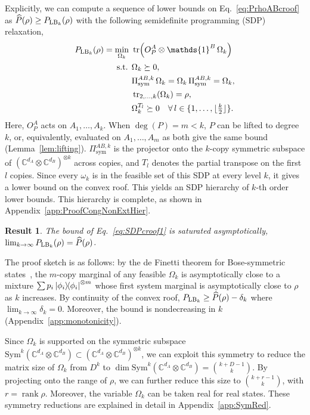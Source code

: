\documentclass[aps,pra,twocolumn,superscriptaddress]{revtex4-2}
\newcommand{\one}{\mathds{1}}
\newcommand{\I}{\one}
\newcommand{\C}{\mathds{C}}
\newtheorem{result}[theorem]{Result}
\begin{document}
Explicitly, we can compute a sequence
of lower bounds on Eq.~\eqref{eq:PrhoABcroof} as $\widehat{P}(\rho)\geq P_{{\rm LB}_k}(\rho)$ with the following semidefinite programming (SDP) relaxation,
\begin{align}
    P_{{\rm LB}_k}(\rho)=\min_{\Omega_k} \ &\tr\!\left(O_P^A \otimes \I^B \, \Omega_k\right)\label{eq:SDPcroof1}\\
    \text{s.t. } & \Omega_k \succeq 0, \nonumber\\
    & \Pi_\text{sym}^{AB,k} \, \Omega_k = \Omega_k\,\Pi_\text{sym}^{AB,k}  = \Omega_k,\nonumber\\
    & \tr_{2,\dots,k} (\Omega_k) = \rho, \nonumber\\
    & \Omega_k^{T_l} \succeq 0 \quad  \forall \, l \in \{1, \dots, \lfloor \tfrac{k}{2}\rfloor\}.\nonumber
\end{align}
Here, $O_P^A$ acts on $A_1,\dots,A_k$. When $\deg(P) = m < k$, $P$ can be lifted to degree $k$, or, equivalently, evaluated on $A_1,\dots,A_m$ as both give the same bound (Lemma~\ref{lem:lifting}). $\Pi_\text{sym}^{AB,k}$ is the projector onto the $k$-copy symmetric subspace of $(\C^{d_A}\otimes\C^{d_B})^{\otimes k}$ across copies, and $T_l$ denotes the partial transpose on the first $l$ copies. Since every $\omega_k$ is in the feasible set of this SDP at every level $k$, it gives a lower bound on the convex roof. This yields an SDP hierarchy of $k$-th order lower bounds. This hierarchy is complete, as shown in Appendix~\ref{app:ProofCongNonExtHier}.
\begin{result}\label{thm:ConvergenceSDPcroof}
The bound of Eq.~\eqref{eq:SDPcroof1} is saturated asymptotically, $\lim_{k\rightarrow\infty} P_{{\rm LB}_k}(\rho) = \widehat{P}(\rho)$.
\end{result}
The proof sketch is as follows: by the de Finetti theorem for Bose-symmetric states~\cite{caves2002unknown,Christandl_2007}, the $m$-copy marginal of any feasible $\Omega_k$ is asymptotically close to a mixture $\sum p_i \dyad{\phi_i}^{\otimes m}$ whose first system marginal is asymptotically close to $\rho$ as $k$ increases. By continuity of the convex roof, $P_{{\rm LB}_k} \geq \widehat{P}(\rho) - \delta_k$ where $\lim_{k\to \infty}\delta_k=0$. Moreover, the bound is nondecreasing in $k$ (Appendix~\ref{app:monotonicity}).

Since $\Omega_k$ is supported on the symmetric subspace $\text{Sym}^k(\C^{d_A}\otimes\C^{d_B})\subset(\C^{d_A}\otimes\C^{d_B})^{\otimes k}$, we can exploit this symmetry to reduce the matrix size of $\Omega_k$ from $D^{k}$ to $\dim \text{Sym}^k(\C^{d_A}\otimes\C^{d_B}) = \binom{k+D-1}{k}$. By projecting onto the range of $\rho$, we can further reduce this size to $\binom{k+r-1}{k}$, with $r=\operatorname{rank}\rho$. Moreover, the variable $\Omega_k$ can be taken real for real states. These symmetry reductions are explained in detail in Appendix~\ref{app:SymRed}.
\end{document}
